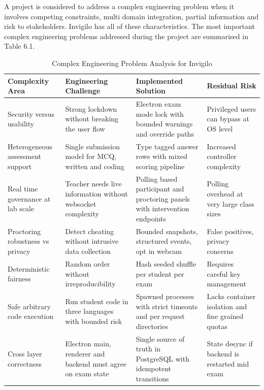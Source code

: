 \documentclass[12pt, a4paper]{report}
\begin{document}
\begin{justify}
  {\fontsize{12}{18}\selectfont
    A project is considered to address a complex engineering problem when it involves competing constraints, multi domain integration, partial information and risk to stakeholders. Invigilo has all of these characteristics. The most important complex engineering problems addressed during the project are summarised in Table 6.1.
  }
\end{justify}

\begin{table}[H]
  \caption{Complex Engineering Problem Analysis for Invigilo}
  \label{tab:6.1}
  \centering
  {\fontsize{10}{13}\selectfont
    \begin{tabular}{|p{1.4in}|p{1.6in}|p{1.6in}|p{0.9in}|}
      \hline
      \textbf{Complexity Area} & \textbf{Engineering Challenge} & \textbf{Implemented Solution} & \textbf{Residual Risk} \\
      \hline
      Security versus usability & Strong lockdown without breaking the user flow & Electron exam mode lock with bounded warnings and override paths & Privileged users can bypass at OS level \\
      \hline
      Heterogeneous assessment support & Single submission model for MCQ, written and coding & Type tagged answer rows with mixed scoring pipeline & Increased controller complexity \\
      \hline
      Real time governance at lab scale & Teacher needs live information without websocket complexity & Polling based participant and proctoring panels with intervention endpoints & Polling overhead at very large class sizes \\
      \hline
      Proctoring robustness vs privacy & Detect cheating without intrusive data collection & Bounded snapshots, structured events, opt in webcam & False positives, privacy concerns \\
      \hline
      Deterministic fairness & Random order without irreproducibility & Hash seeded shuffle per student per exam & Requires careful key management \\
      \hline
      Safe arbitrary code execution & Run student code in three languages with bounded risk & Spawned processes with strict timeouts and per request directories & Lacks container isolation and fine grained quotas \\
      \hline
      Cross layer correctness & Electron main, renderer and backend must agree on exam state & Single source of truth in PostgreSQL with idempotent transitions & State desync if backend is restarted mid exam \\
      \hline
    \end{tabular}
  }
\end{table}
\end{document}
